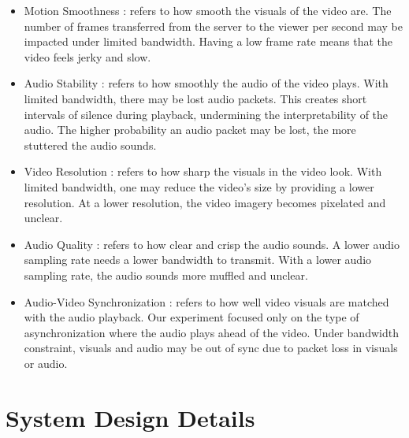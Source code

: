 \begin{itemize}
    \item Motion Smoothness \cite{huynh2008temporal, oeldorf2012bad}: refers to how smooth the visuals of the video are. The number of frames transferred from the server to the viewer per second may be impacted under limited bandwidth. Having a low frame rate means that the video feels jerky and slow.
    \item Audio Stability \cite{hardman1998successful}: refers to how smoothly the audio of the video plays. With limited bandwidth, there may be lost audio packets. This creates short intervals of silence during playback, undermining the interpretability of the audio. The higher probability an audio packet may be lost, the more stuttered the audio sounds.
    \item Video Resolution \cite{oeldorf2012bad, knoche2005can}: refers to how sharp the visuals in the video look. With limited bandwidth, one may reduce the video's size by providing a lower resolution. At a lower resolution, the video imagery becomes pixelated and unclear. 
    \item Audio Quality \cite{oeldorf2012bad, noll1993wideband}: refers to how clear and crisp the audio sounds. A lower audio sampling rate needs a lower bandwidth to transmit. With a lower audio sampling rate, the audio sounds more muffled and unclear.
    \item Audio-Video Synchronization \cite{steinmetz1996human}: refers to how well video visuals are matched with the audio playback. Our experiment focused only on the type of asynchronization where the audio plays ahead of the video. Under bandwidth constraint, visuals and audio may be out of sync due to packet loss in visuals or audio.
\end{itemize}



\section{System Design Details}

